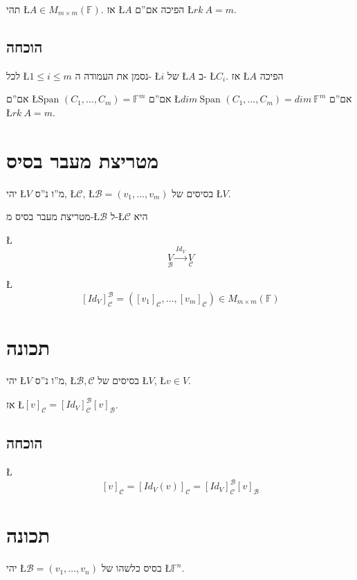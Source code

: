 \documentclass[english,hebrew]{article}
\newcommand{\sqrm}{M_{m\times m}(\mathbb{F})}
\newcommand{\spn}{\text{Span }}
\begin{document}
תהי \L{$A\in\sqrm$}. אז \L{$A$} הפיכה אם\textquotedblright ם \L{$rk\:A=m$}.

\subsection{הוכחה}

לכל \L{$1\le i\leq m$} נסמן את העמודה ה- \L{$i$} של \L{$A$} ב-
\L{$C_{i}$}. אז \L{$A$} הפיכה

אם\textquotedblright ם \L{$\spn(C_{1},\dots,C_{m})=\mathbb{F}^{m}$}
אם\textquotedblright ם \L{$dim\:\spn(C_{1},\dots,C_{m})=dim\:\mathbb{F}^{m}$}
אם\textquotedblright ם \L{$rk\:A=m$}.

\section{מטריצת מעבר בסיס}

יהי \L{$V$} מ\textquotedblright ו נ\textquotedblright ס, \L{$\mathcal{C}$},
\L{$\mathcal{B}=(v_{1},\dots,v_{m})$} בסיסים של \L{$V$}.

מטריצת מעבר בסיס מ-\L{$\mathcal{B}$} ל-\L{$\mathcal{C}$} היא

\L{%
\[
\underset{\mathcal{B}}{V}\overset{Id_{V}}{\longrightarrow}\underset{\mathcal{C}}{V}
\]
}%

\L{%
\[
[Id_{V}]_{\mathcal{C}}^{\mathcal{B}}=\left([v_{1}]_{\mathcal{C}},\dots,[v_{m}]_{\mathcal{C}}\right)\in\sqrm
\]
}%

\section{תכונה}

יהי \L{$V$} מ\textquotedblright ו נ\textquotedblright ס, \L{$\mathcal{B},\mathcal{C}$}
בסיסים של \L{$V$}, \L{$v\in V$}.

אז \L{$[v]_{\mathcal{C}}=[Id_{V}]_{\mathcal{C}}^{\mathcal{B}}[v]_{\mathcal{B}}$}.

\subsection{הוכחה}

\L{%
\[
[v]_{\mathcal{C}}=[Id_{V}(v)]_{\mathcal{C}}=[Id_{V}]_{\mathcal{C}}^{\mathcal{B}}[v]_{\mathcal{B}}
\]
}%

\section{תכונה}

יהי \L{$\mathcal{B}=(v_{1},\dots,v_{n})$} בסיס כלשהו של \L{$\mathbb{F}^{n}$}.
\end{document}
